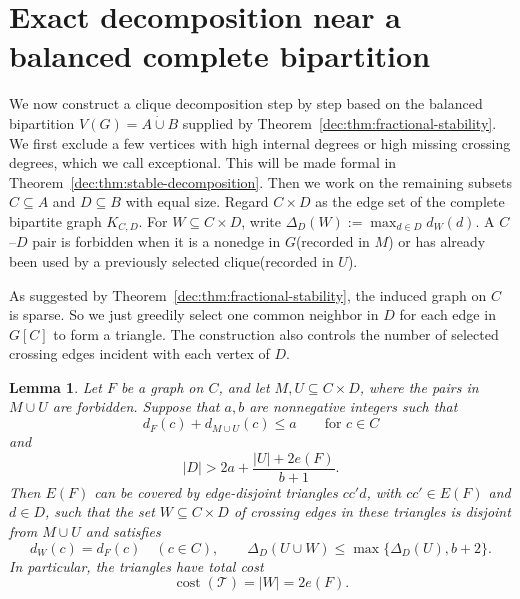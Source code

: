 \documentclass[11pt]{article}
\numberwithin{equation}{section}
\newtheorem{lemma}[theorem]{Lemma}
\theoremstyle{remark}
\DeclareMathOperator{\cost}{cost}
\newcommand{\dotcupunion}{\mathbin{\dot\cup}}
\begin{document}
\section{Exact decomposition near a balanced complete bipartition}\label{dec:sec:exact-near-cut}

We now construct a clique decomposition step by step based on the balanced bipartition \(V(G)=A\dotcupunion B\)
supplied by Theorem~\ref{dec:thm:fractional-stability}. We first exclude a few vertices with high internal degrees
or high missing crossing degrees, which we call exceptional. This will be made formal in
Theorem~\ref{dec:thm:stable-decomposition}. Then we work on the remaining subsets \(C\subseteq A\) and \(D\subseteq B\)
with equal size. Regard \(C\times D\) as the edge set of the complete bipartite graph \(K_{C,D}\).
For \(W\subseteq C\times D\), write \(\Delta_D(W):=\max_{d\in D}d_W(d)\). A \(C\)--\(D\) pair is forbidden
when it is a nonedge in \(G\)(recorded in \(M\)) or has already been used by a previously selected clique(recorded in \(U\)).

As suggested by Theorem~\ref{dec:thm:fractional-stability}, the induced graph on \(C\) is sparse.
So we just greedily select one common neighbor in \(D\) for each edge in \(G[C]\) to form a triangle.
The construction also controls the number of selected crossing edges incident with each vertex of \(D\).

\begin{lemma}
\label{dec:lem:triangle-extension}
Let \(F\) be a graph on \(C\), and let \(M,U\subseteq C\times D\), where
the pairs in \(M\cup U\) are forbidden. Suppose that \(a,b\) are nonnegative integers such that
\begin{equation*}
 d_F(c)+d_{M\cup U}(c)\le a\qquad \text{for\ }c\in C
\end{equation*}
and
\begin{equation}\label{dec:eq:3.3}
 |D|>2a+\frac{|U|+2e(F)}{b+1}.
\end{equation}
Then \(E(F)\) can be covered by edge-disjoint triangles \(cc'd\), with
\(cc'\in E(F)\) and \(d\in D\), such that the set
\(W\subseteq C\times D\) of crossing edges in these triangles is disjoint
from \(M\cup U\) and satisfies
\begin{equation}\label{dec:eq:3.4}
 d_W(c)=d_F(c)\quad(c\in C),\qquad
 \Delta_D(U\cup W)\le\max\{\Delta_D(U),b+2\}.
\end{equation}
In particular, the triangles have total cost
\begin{equation*}
  \cost(\mathcal T)=|W|=2e(F).
\end{equation*}
\end{lemma}
\end{document}
